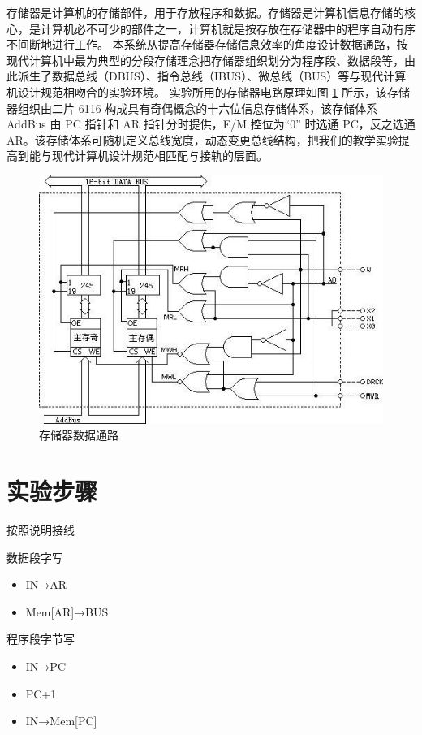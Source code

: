 \documentclass[a4paper,10pt,UTF8]{paper}
\numberwithin{equation}{section}
\numberwithin{figure}{section}
\begin{document}
存储器是计算机的存储部件，用于存放程序和数据。存储器是计算机信息存储的核心，是计算机必不可少的部件之一，计算机就是按存放在存储器中的程序自动有序不间断地进行工作。
本系统从提高存储器存储信息效率的角度设计数据通路，按现代计算机中最为典型的分段存储理念把存储器组织划分为程序段、数据段等，由此派生了数据总线（DBUS）、指令总线（IBUS）、微总线（BUS）等与现代计算机设计规范相吻合的实验环境。
实验所用的存储器电路原理如图 \ref{fig:2} 所示，该存储器组织由二片 6116 构成具有奇偶概念的十六位信息存储体系，该存储体系 AddBus 由 PC 指针和 AR 指针分时提供，E/M 控位为“0” 时选通 PC，反之选通 AR。该存储体系可随机定义总线宽度，动态变更总线结构，把我们的教学实验提高到能与现代计算机设计规范相匹配与接轨的层面。

\begin{figure}[h]
  \centering
  \includegraphics[width=0.8\linewidth]{2.jpg}
  \caption{ 存储器数据通路}
  \label{fig:2}
\end{figure}


\section{实验步骤}

按照说明接线


数据段字写 
\begin{itemize}
  \item IN→AR 
  \item Mem[AR]→BUS
\end{itemize}

程序段字节写
\begin{itemize}
  \item IN→PC
  \item  PC+1 
  \item IN→Mem[PC]
\end{itemize}
 
\end{document}
